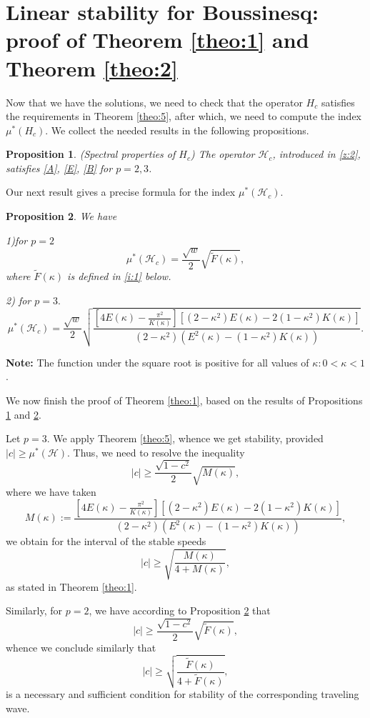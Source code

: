 \documentclass[final,11pt,leqno]{amsart}
\newtheorem{proposition}{Proposition}
\begin{document}
\section{Linear stability for Boussinesq: proof of  Theorem \ref{theo:1} and Theorem \ref{theo:2}}
\label{sec:133}
Now that we have the solutions, we need to check that the operator $H_c$ satisfies the requirements in Theorem \ref{theo:5}, after which,
we need to compute the index $\mu^*(H_c)$.
We collect the needed results in the following propositions.
\begin{proposition}(Spectral properties of $H_c$)
\label{prop:1}
The operator ${\mathcal H}_c$, introduced in \eqref{z:2},
satisfies \eqref{A}, \eqref{E}, \eqref{B} for $p=2,3$.
\end{proposition}
Our next result gives a precise formula for the index $\mu^*({\mathcal H}_c)$.
\begin{proposition}
\label{prop:2} We have

1)for $p=2$
$$\mu^*({\mathcal H}_c)={\frac{\sqrt{w}}{2}}\sqrt{\widetilde{F}(\kappa)},
$$
where $\widetilde{F}(\kappa)$ is defined in \eqref{i:1} below. 

2) for  $p=3.$
$$
\mu^*({\mathcal H}_c)={\frac{{ \sqrt{w}}}{{2}}}
\sqrt{{\frac{{\left[4E({\kappa})-{\frac{{\pi^2}}{{K({\kappa})}}}\right][(2-{\kappa}^2)
E({\kappa})-2(1-{\kappa}^2)K({\kappa})]}}{{(2-{\kappa}^2)(E^2({\kappa})-(1-{\kappa}^2) K({\kappa}))}}}}.
$$
\end{proposition}
{\bf Note:} The function under the square root is positive for all values of ${\kappa}: 0<{\kappa}<1$.

We now finish the proof of Theorem \ref{theo:1}, based on the results of Propositions \ref{prop:1} and \ref{prop:2}.

Let $p=3$. We apply Theorem \ref{theo:5}, whence we get stability, provided $|c|\geq \mu^*({\mathcal H})$. Thus, we need to resolve the inequality
$$
|c|\geq  {\frac{{\sqrt{1-c^2}}}{{2}}}
\sqrt{M({\kappa})},
$$
where we have taken
$$
M({\kappa}):={\frac{{\left[4E({\kappa})-{\frac{{\pi^2}}{{K({\kappa})}}}\right][(2-{\kappa}^2) E({\kappa})-2(1-{\kappa}^2)K({\kappa})]}}{{(2-{\kappa}^2)(E^2({\kappa})-(1-{\kappa}^2) K({\kappa}))}}},
$$
we obtain for the interval of the stable speeds
$$
|c|\geq \sqrt{{\frac{{M({\kappa})}}{{4+M({\kappa})}}}},
$$
as stated in Theorem \ref{theo:1}.

Similarly, for $p=2$, we have according to Proposition \ref{prop:2} that
$$
|c|\geq  {\frac{{\sqrt{1-c^2}}}{{2}}}
\sqrt{\tilde{F}({\kappa})},
$$
whence we conclude similarly that $$
|c|\geq \sqrt{{\frac{{\tilde{F}({\kappa})}}{{4+\tilde{F}({\kappa})}}}},
$$
is a necessary and sufficient condition for stability of the corresponding traveling wave.
\end{document}

